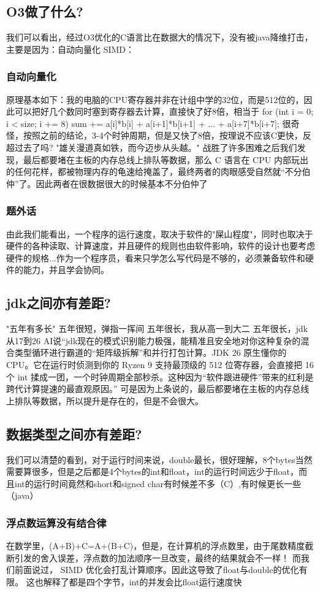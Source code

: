 \documentclass[UTF8]{ctexart}
\begin{document}
\subsection{O3做了什么?}
我们可以看出，经过O3优化的C语言比在数据大的情况下，没有被java降维打击，主要是因为：自动向量化 SIMD：
\subsubsection{自动向量化}
原理基本如下：我的电脑的CPU寄存器并非在计组中学的32位，而是512位的，因此可以把好几个数同时塞到寄存器去计算，直接快了好8倍，相当于
for (int i = 0; i < size; i += 8) {
    sum += a[i]*b[i] + a[i+1]*b[i+1] + ... + a[i+7]*b[i+7];
}
很奇怪，按照之前的结论，3-4个时钟周期，但是又快了8倍，按理说不应该C更快，反超过去了吗?
"雄关漫道真如铁，而今迈步从头越。"
战胜了许多困难之后我们发现，最后都要堵在主板的内存总线上排队等数据，那么 C 语言在 CPU 内部玩出的任何花样，都被物理内存的龟速给掩盖了，最终两者的肉眼感受自然就“不分伯仲”了。因此两者在很数据很大的时候基本不分伯仲了
\subsubsection{题外话}
由此我们能看出，一个程序的运行速度，取决于软件的"屎山程度"，同时也取决于硬件的各种读取、计算速度，并且硬件的规则也由软件影响，软件的设计也要考虑硬件的规格...作为一个程序员，看来只学怎么写代码是不够的，必须兼备软件和硬件的能力，并且学会协同。
\subsection{jdk之间亦有差距?}
"五年有多长"
五年很短，弹指一挥间
五年很长，我从高一到大二
五年很长，jdk从17到26
AI说“jdk现在的模式识别能力极强，能精准且安全地对你这种复杂的混合类型循环进行霸道的“矩阵级拆解”和并行打包计算。JDK 26 原生懂你的 CPU。它在运行时侦测到你的 Ryzen 9 支持最顶级的 512 位寄存器，会直接把 16 个 int 揉成一团，一个时钟周期全部秒杀。这种因为“软件跟进硬件”带来的红利是跨代计算提速的最直观原因。”
可是因为上条说的，最后都要堵在主板的内存总线上排队等数据，所以提升是存在的，但是不会很大。
\subsection{数据类型之间亦有差距?}
我们可以清楚的看到，对于运行时间来说，double最长，很好理解，8个bytes当然需要算很多，但是之后都是4个bytes的int和float，int的运行时间远少于float，而且int的运行时间竟然和short和signed char有时候差不多（C）,有时候更长一些（java）
\subsubsection{浮点数运算没有结合律}
在数学里，(A+B)+C=A+(B+C)，但是，在计算机的浮点数里，由于尾数精度截断引发的舍入误差，浮点数的加法顺序一旦改变，最终的结果就会不一样！
而我们前面说过， SIMD 优化会打乱计算顺序。因此这导致了float与double的优化有限。
这也解释了都是四个字节，int的并发会比float运行速度快
\end{document}
